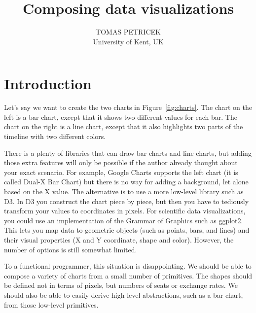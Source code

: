 \documentclass{jfp}
\title{Composing data visualizations}
\author[Tomas Petricek]{TOMAS PETRICEK\\
       University of Kent, UK\\
       \email{t.petricek@kent.ac.uk}}
\begin{document}
\maketitle[f]





\section{Introduction}
Let's say we want to create the two charts in Figure~\ref{fig:charts}. The chart on the left is
a bar chart, except that it shows two different values for each bar. The chart on the
right is a line chart, except that it also highlights two parts of the timeline with two different
colors.

There is a plenty of libraries that can draw bar charts and line charts, but adding those extra
features will only be possible if the author already thought about your exact scenario. For
example, Google Charts supports the left chart (it is called Dual-X Bar Chart) but there is no
way for adding a background, let alone based on the X value. The alternative is to use a more
low-level library such as D3. In D3 you construct the chart piece by piece, but then you have to
tediously transform your values to coordinates in pixels. For scientific data visualizations,
you could use an implementation of the Grammar of Graphics such as ggplot2. This lets you
map data to geometric objects (such as points, bars, and lines) and their visual properties
(X and Y coordinate, shape and color). However, the number of options is still somewhat limited.

To a functional programmer, this situation is disappointing. We should be able to
compose a variety of charts from a small number of primitives. The shapes should be defined
not in terms of pixels, but numbers of seats or exchange rates. We should also be able to easily
derive high-level abstractions, such as a bar chart, from those low-level primitives.
\end{document}
